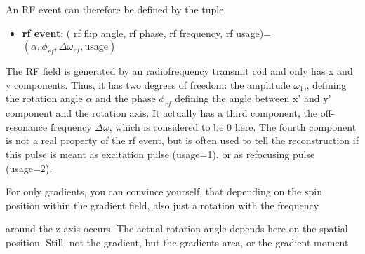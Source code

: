 \documentclass[a4paper,12pt]{extarticle}
\begin{document}
An RF event can therefore be defined by the tuple  
 
\begin{itemize}
\item \textbf{rf event}: ( rf flip angle, rf phase, rf frequency, rf usage)= $(\alpha, \phi_{rf}, \Delta\omega_{rf}, \text{usage})$
\end{itemize}

The RF field is generated by an radiofrequency transmit coil and only has x and y components. Thus, it has two degrees of freedom: the amplitude $\omega_1$,, defining the rotation angle $\alpha$ and the phase $\phi_{rf}$ defining the angle between x' and y' component and the rotation axis. It actually has a third component, the off-resonance frequency $\Delta\omega$, which is considered to be 0 here. The fourth component is not a real property of the rf event, but is often used to tell the reconstruction if this pulse is meant as excitation pulse (usage=1), or as refocusing pulse (usage=2).
\\
\newline

For only gradients, you can convince yourself, that depending on the spin position within the gradient field, also just a rotation with the frequency


around the z-axis occurs. The actual rotation angle depends here on the spatial position. Still, not the gradient, but the gradients area, or the gradient moment 
\end{document}
